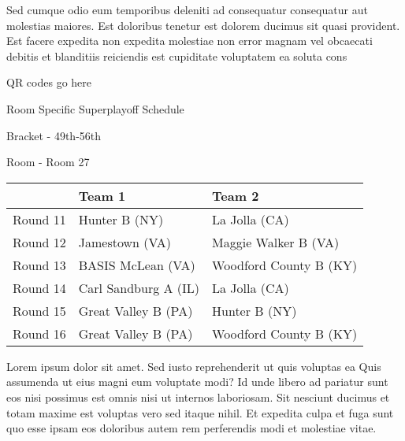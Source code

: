 \documentclass{article}%
\begin{document}
\newline%
    Sed cumque odio eum temporibus deleniti ad consequatur consequatur aut molestias maiores. Est doloribus tenetur est dolorem ducimus sit quasi provident. Est facere expedita non expedita molestiae non error magnam vel obcaecati debitis et blanditiis reiciendis est cupiditate voluptatem ea soluta cons%
\vspace*{140pt}%
\begin{center}%
\begin{Huge}%
QR codes go here%
\end{Huge}%
\end{center}%
\newpage%
\begin{center}%
\begin{Huge}%
Room Specific Superplayoff Schedule%
\end{Huge}%
\vspace*{8pt}%
\linebreak%
\begin{Large}%
Bracket {-} 49th{-}56th%
\end{Large}%
\vspace*{8pt}%
\linebreak%
\vspace*{8pt}%
\begin{Large}%
Room {-} Room 27%
\end{Large}%
\end{center}%
%
\begin{tabularx}{\textwidth}{|c|Y|Y|}%
\hline%
&Team 1&Team 2\\%
\hline%
Round 11&Hunter B (NY)&La Jolla (CA)\\%
Round 12&Jamestown (VA)&Maggie Walker B (VA)\\%
Round 13&BASIS McLean (VA)&Woodford County B (KY)\\%
Round 14&Carl Sandburg A (IL)&La Jolla (CA)\\%
Round 15&Great Valley B (PA)&Hunter B (NY)\\%
Round 16&Great Valley B (PA)&Woodford County B (KY)\\%
\hline%
\end{tabularx}%
\vspace*{8pt}%
\newline%
    Lorem ipsum dolor sit amet. Sed iusto reprehenderit ut quis voluptas ea Quis assumenda ut eius magni eum voluptate modi? Id unde libero ad pariatur sunt eos nisi possimus est omnis nisi ut internos laboriosam. Sit nesciunt ducimus et totam maxime est voluptas vero sed itaque nihil. Et expedita culpa et fuga sunt quo esse ipsam eos doloribus autem rem perferendis modi et molestiae vitae.\newline%
\end{document}
